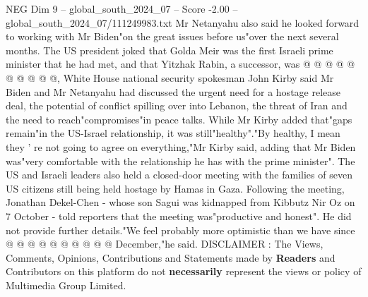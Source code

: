 \begin{textsample}{NEG Dim 9 – global\_south\_2024\_07 – Score -2.00 – global\_south\_2024\_07/111249983.txt}
Mr Netanyahu also said he looked forward to working with Mr Biden"on the great issues before us"over the next several months.
The US president joked that Golda Meir was the first Israeli prime minister that he had met, and that Yitzhak Rabin, a successor, was @ @ @ @ @ @ @ @ @ @, White House national security spokesman John Kirby said Mr Biden and Mr Netanyahu had discussed the urgent need for a hostage release deal, the potential of conflict spilling over into Lebanon, the threat of Iran and the need to reach"compromises"in peace talks.
While Mr Kirby added that"gaps remain"in the US-Israel relationship, it was still"healthy"."By healthy, I mean they ' re not going to agree on everything,"Mr Kirby said, adding that Mr Biden was"very comfortable with the relationship he has with the prime minister".
The US and Israeli leaders also held a closed-door meeting with the families of seven US citizens still being held hostage by Hamas in Gaza.
Following the meeting, Jonathan Dekel-Chen - whose son Sagui was kidnapped from Kibbutz Nir Oz on 7 October - told reporters that the meeting was"productive and honest".
He did not provide further details."We feel probably more optimistic than we have since @ @ @ @ @ @ @ @ @ @ December,"he said.
DISCLAIMER : The Views, Comments, Opinions, Contributions and Statements made by \textbf{Readers} and Contributors on this platform do not \textbf{necessarily} represent the views or policy of Multimedia Group Limited.

\end{textsample}
